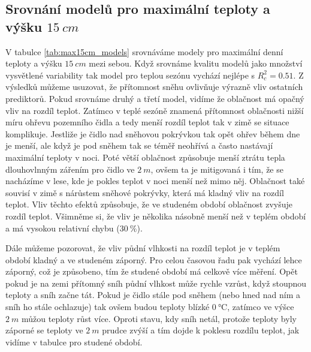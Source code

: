 \subsection{Srovnání modelů pro maximální teploty a výšku $\SI{15}{cm}$}
V tabulce \ref{tab:max15cm_models} srovnáváme modely pro maximální denní teploty a výšku $\SI{15}{cm}$ mezi sebou. Když srovnáme kvalitu modelů jako množství vysvětlené variability tak model pro teplou sezónu vychází nejlépe s $R_c^2 = 0.51$. Z výsledků můžeme usuzovat, že přítomnost sněhu ovlivňuje výrazně vliv ostatních prediktorů. Pokud srovnáme druhý a třetí model, vidíme že oblačnost má opačný vliv na rozdíl teplot. Zatímco v teplé sezóně znamená přítomnost oblačnosti nižší míru ohřevu pozemního čidla a tedy menší rozdíl teplot tak v zimě se situace komplikuje. Jestliže je čidlo nad sněhovou pokrývkou tak opět ohřev během dne je menší, ale když je pod sněhem tak se téměř neohřívá a často nastávají maximální teploty v noci. Poté větší oblačnost způsobuje menší ztrátu tepla dlouhovlnným zářením pro čidlo ve $\SI{2}{m}$, ovšem ta je mitigovaná i tím, že se nacházíme v lese, kde je pokles teplot v noci menší než mimo něj. Oblačnost také souvisí v zimě s nárůstem sněhové pokrývky, která má kladný vliv na rozdíl teplot. Vliv těchto efektů způsobuje, že ve studeném období oblačnost zvyšuje rozdíl teplot. Všimněme si, že vliv je několika násobně menší než v teplém období a má vysokou relativní chybu ($\SI{30}{\%}$).

Dále můžeme pozorovat, že vliv půdní vlhkosti na rozdíl teplot je v teplém období kladný a ve studeném záporný. Pro celou časovou řadu pak vychází lehce záporný, což je způsobeno, tím že studené období má celkově více měření. Opět pokud je na zemi přítomný sníh půdní vlhkost může rychle vzrůst, když stoupnou teploty a sníh začne tát. Pokud je čidlo stále pod sněhem (nebo hned nad ním a sníh ho stále ochlazuje) tak ovšem budou teploty blízké $\SI{0}{\celsius}$, zatímco ve výšce $\SI{2}{m}$ můžou teploty růst více. Oproti stavu, kdy sníh netál, protože teploty byly záporné se teploty ve $\SI{2}{m}$ prudce zvýší a tím dojde k poklesu rozdílu teplot, jak vidíme v tabulce pro studené období.


